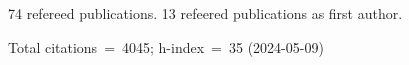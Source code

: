 74 refereed publications. 13 refeered publications as first author.

Total citations~=~4045; h-index~=~35 (2024-05-09)